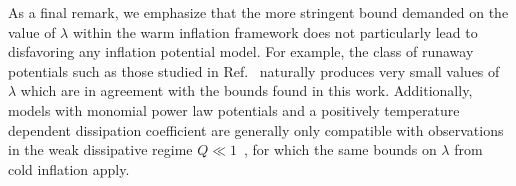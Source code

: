 As a final remark, we emphasize that the more stringent bound demanded on the value of $\lambda$ within the warm inflation framework does not particularly lead to disfavoring any inflation potential model. For example, the class of runaway potentials such as those studied in Ref.~\citep{Das:2020xmh} naturally produces very small values of $\lambda$ which are in agreement with the bounds found in this work. Additionally, models with monomial power law potentials and a positively temperature dependent dissipation coefficient are generally only compatible with observations in the weak dissipative regime $Q \ll 1$~\citep{Benetti:2016jhf}, for which the same bounds on $\lambda$ from cold inflation apply.



